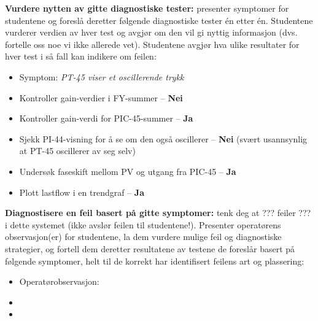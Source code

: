 \vskip 10pt

\filbreak


\noindent
{\bf Vurdere nytten av gitte diagnostiske tester:} presenter symptomer for studentene og foreslå deretter følgende diagnostiske tester én etter én. Studentene vurderer verdien av hver test og avgjør om den vil gi nyttig informasjon (dvs. fortelle oss noe vi ikke allerede vet). Studentene avgjør hva ulike resultater for hver test i så fall kan indikere om feilen:

\begin{itemize}
\item{} Symptom: {\it PT-45 viser et oscillerende trykk}
\item{} Kontroller gain-verdier i FY-summer -- {\bf Nei}
\item{} Kontroller gain-verdi for PIC-45-summer -- {\bf Ja}
\item{} Sjekk PI-44-visning for å se om den også oscillerer -- {\bf Nei} (svært usannsynlig at PT-45 oscillerer av seg selv)
\item{} Undersøk faseskift mellom PV og utgang fra PIC-45 -- {\bf Ja}
\item{} Plott lastflow i en trendgraf -- {\bf Ja}
\end{itemize}


\vskip 10pt


\noindent
{\bf Diagnostisere en feil basert på gitte symptomer:} tenk deg at ??? feiler ??? i dette systemet (ikke avslør feilen til studentene!). Presenter operatørens observasjon(er) for studentene, la dem vurdere mulige feil og diagnostiske strategier, og fortell dem deretter resultatene av testene de foreslår basert på følgende symptomer, helt til de korrekt har identifisert feilens art og plassering:

\begin{itemize}
\item{} Operatørobservasjon: {\it }
\item{} 
\item{} 
\end{itemize}


